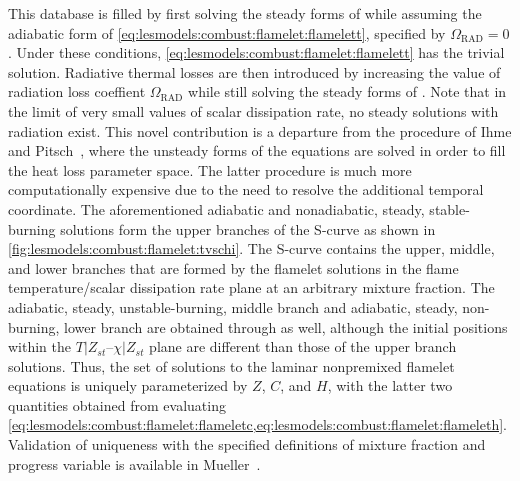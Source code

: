 This database is filled by first solving the steady forms of  while assuming the adiabatic form of \cref{eq:lesmodels:combust:flamelet:flamelett}, specified by $\Omega_{\text{RAD}} = 0$. Under these conditions, \cref{eq:lesmodels:combust:flamelet:flamelett} has the trivial solution. Radiative thermal losses are then introduced by increasing the value of radiation loss coeffient $\Omega_{\text{RAD}}$ while still solving the steady forms of . Note that in the limit of very small values of scalar dissipation rate, no steady solutions with radiation exist. This novel contribution is a departure from the procedure of Ihme and Pitsch~\cite{ihme2008}, where the unsteady forms of the equations are solved in order to fill the heat loss parameter space. The latter procedure is much more computationally expensive due to the need to resolve the additional temporal coordinate. The aforementioned adiabatic and nonadiabatic, steady, stable-burning solutions form the upper branches of the S-curve as shown in \cref{fig:lesmodels:combust:flamelet:tvschi}. The S-curve contains the upper, middle, and lower branches that are formed by the flamelet solutions in the flame temperature/scalar dissipation rate plane at an arbitrary mixture fraction. The adiabatic, steady, unstable-burning, middle branch and adiabatic, steady, non-burning, lower branch are obtained through  as well, although the initial positions within the $T|Z_{st}$--$\chi|Z_{st}$ plane are different than those of the upper branch solutions. Thus, the set of solutions to the laminar nonpremixed flamelet equations is uniquely parameterized by $Z$, $C$, and $H$, with the latter two quantities obtained from evaluating \cref{eq:lesmodels:combust:flamelet:flameletc,eq:lesmodels:combust:flamelet:flameleth}. Validation of uniqueness with the specified definitions of mixture fraction and progress variable is available in Mueller~\cite{muellerphd}.

